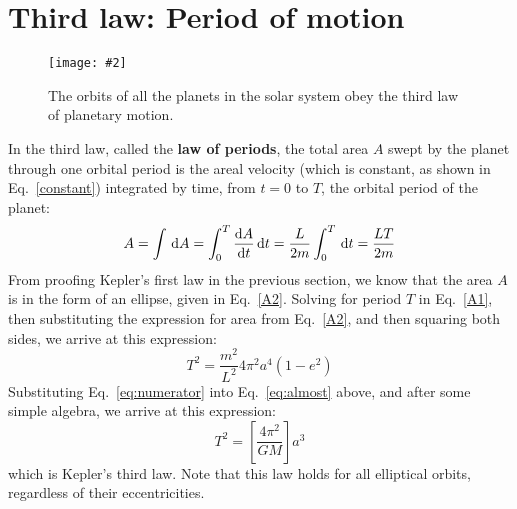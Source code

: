 \documentclass{../../oss-handout}
\newcommand{\pic}[2]{\texttt{[image: \#2]}}
\begin{document}
\section{Third law: Period of motion}
\begin{figure}[!ht]
  \centering
  \pic{.55}{../kep8}
  \caption{The orbits of all the planets in the solar system obey the third
  law of planetary motion.}
  \label{3rdlaw}
\end{figure}
In the third law, called the \textbf{law of periods}, the total area $A$ swept
by the planet through one orbital period is the areal velocity (which is
constant, as shown in Eq.\ \ref{constant}) integrated by time, from $t=0$ to
$T$, the orbital period of the planet:
\begin{equation}
  A=\int\dl A=\int_0^T\diff At\dl t=\frac L{2m}\int_0^T\dl t=\frac{LT}{2m}
  \label{A1}
\end{equation}
From proofing Kepler's first law in the previous section, we know that the
area $A$ is in the form of an ellipse, given in Eq.~\ref{A2}. Solving for
period $T$ in Eq.~\ref{A1}, then substituting the expression for area from
Eq.~\ref{A2}, and then squaring both sides, we arrive at this expression:
\begin{equation}
  T^2=\frac{m^2}{L^2}4\pi^2a^4(1-e^2)
  \label{eq:almost}
\end{equation}
Substituting Eq.~\ref{eq:numerator} into Eq.\ \ref{eq:almost} above, and after
some simple algebra, we arrive at this expression:
\begin{equation}
  \boxed{T^2=\left[\frac{4\pi^2}{GM}\right] a^3}
\end{equation}
which is Kepler's third law. Note that this law holds for all elliptical
orbits, regardless of their eccentricities.
\end{document}
